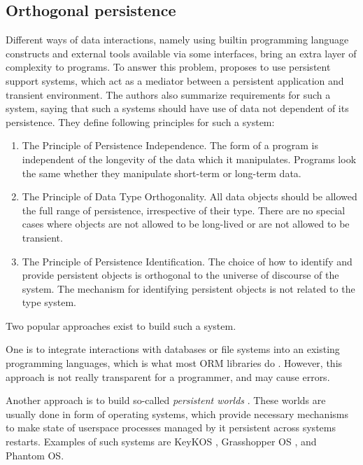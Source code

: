 \subsection{Orthogonal persistence}

Different ways of data interactions, namely using builtin programming language 
constructs and external tools available via some interfaces, bring an extra
layer of complexity to programs. To answer this problem, 
\cite{atkinson1995orthogonally} proposes to use persistent support systems, 
which act as a mediator between a persistent application and transient 
environment. The authors also summarize requirements for such a system, saying 
that such a systems should have use of data not dependent of its persistence.
They define following principles for such a system:
\begin{enumerate}
    \item The Principle of Persistence Independence. The form of a program is 
    independent of the longevity of the data which it manipulates. Programs look 
    the same whether they manipulate short-term or long-term data.
    \item The Principle of Data Type Orthogonality. All data objects should be 
    allowed the full range of persistence, irrespective of their type. There are 
    no special cases where objects are not allowed to be long-lived or are not 
    allowed to be transient.
    \item  The Principle of Persistence Identification. The choice of how to 
    identify and provide persistent objects is orthogonal to the universe of 
    discourse of the system. The mechanism for identifying persistent objects is 
    not related to the type system.
\end{enumerate}

Two popular approaches exist to build such a system. 

One is to integrate interactions with databases or file systems into an existing 
programming languages, which is what most ORM libraries do 
\cite{аннин2018краткий,bayer2010sqlalchemy}. However, this approach is not 
really transparent for a programmer, and may cause errors. 

Another approach is to build so-called \textit{persistent worlds} 
\cite{atkinson1995orthogonally}. These worlds are usually done in form of 
operating systems, which provide necessary mechanisms to make state of   
userspace processes managed by it persistent across systems restarts. 
Examples of such systems are KeyKOS \cite{bomberger1992keykos}, Grasshopper OS
\cite{dearle1994grasshopper}, and Phantom OS.

